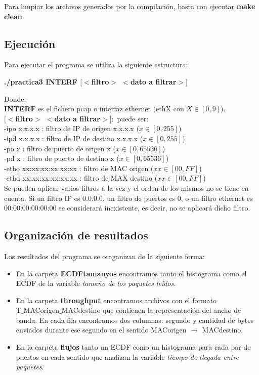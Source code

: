 \documentclass[a4paper, 11pt]{article}	%
\begin{document}
Para limpiar los archivos generados por la compilación, basta con ejecutar \textbf{make clean}.

\subsection{Ejecución}
Para ejecutar el programa se utiliza la siguiente estructura:

\begin{center}
\textbf{./practica3 INTERF $[<$filtro$>$ $<$dato a filtrar$>]$}
\end{center}

\noindent Donde:\\
\textbf{INTERF} es el fichero pcap o interfaz ethernet (ethX con $X \in [0,9]$).\\
\textbf{$[<$filtro$>$ $<$dato a filtrar$>]:$} puede ser:\\
\indent -ipo x.x.x.x : filtro de IP de origen x.x.x.x ($x \in [0, 255]$)\\
\indent -ipd x.x.x.x : filtro de IP de destino x.x.x.x ($x \in [0, 255]$)\\
\indent -po x : filtro de puerto de origen x ($x \in [0,65536]$)\\
\indent -pd x : filtro de puerto de destino x ($x \in [0,65536]$)\\
\indent -etho xx:xx:xx:xx:xx:xx : filtro de MAC origen ($xx \in [00,FF]$)\\
\indent -ethd xx:xx:xx:xx:xx:xx : filtro de MAX destino ($xx \in [00,FF]$)\\

Se pueden aplicar varios filtros a la vez y el orden de los mismos no se tiene en cuenta.
Si un filtro IP es 0.0.0.0, un filtro de puertos es 0, o un filtro ethernet es 00:00:00:00:00:00 se considerará inexistente, es decir, no se aplicará dicho filtro.

\subsection{Organización de resultados}
Los resultados del programa se oraganizan de la siguiente forma:
\begin{itemize}
\item En la carpeta \textbf{ECDFtamanyos} encontramos tanto el histograma como el ECDF de la variable \textit{tamaño de los paquetes leídos}.
\item En la carpeta \textbf{throughput} encontramos archivos con el formato\\ T$\_$MACorigen$\_$MACdestino que contienen la representación del ancho de banda. En cada fila encontramos dos columnas: segundo y cantidad de bytes enviados durante ese segundo en el sentido MACorigen $\longrightarrow$ MACdestino.
\item En la carpeta \textbf{flujos} tanto un ECDF como un histograma para cada par de puertos en cada sentido que analizan la variable \textit{tiempo de llegada entre paquetes}.
\end{itemize}
\end{document}
